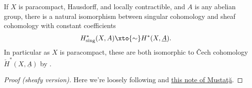 \documentclass[11pt]{book}
\begin{document}
\begin{theorem}\label{thm:Cech-cohomology-and-singular-cohomology} 
If $X$ is paracompact, Hausdorff, and locally contractible, and $A$ is any abelian group, there is a natural isomorphism between singular cohomology and sheaf cohomology with constant coefficients
\begin{align*}
    H^\ast_\text{sing}(X,A) \xto{\sim} H^\ast(X,\underline{A}).
\end{align*}
In particular as $X$ is paracompact, these are both isomorphic to \v{C}ech cohomology $\check{H}^\ast(X,\underline{A})$ by .
\end{theorem}
\begin{proof}[Proof (sheafy version)] Here we're loosely following \cite[III.1]{Bredon-sheaf} and \href{https://public.websites.umich.edu/~mmustata/SingSheafcoho.pdf}{this note of Musta\c{t}\u{a}}.


\end{proof}
\end{document}
